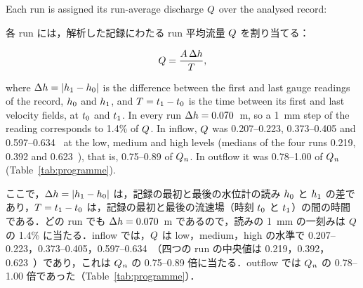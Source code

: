 \label{sec:discharge}

\begin{en}[M3-1]
Each run is assigned its run-average discharge $Q$ over the analysed record:
\end{en}
\begin{ja}
各 run には，解析した記録にわたる run 平均流量 $Q$ を割り当てる：
\end{ja}
\begin{equation}
Q = \frac{A \, \Delta h}{T},
\label{eq:Q}
\end{equation}
\begin{en}
where $\Delta h = |h_{1} - h_{0}|$ is the difference between the first and last gauge readings of the record, $h_{0}$ and $h_{1}$, and $T = t_{1} - t_{0}$ is the time between its first and last velocity fields, at $t_{0}$ and $t_{1}$. In every run $\Delta h = 0.070$~m, so a 1~mm step of the reading corresponds to 1.4\% of $Q$. In inflow, $Q$ was 0.207--0.223, 0.373--0.405 and 0.597--0.634~\Lps{} at the low, medium and high levels (medians of the four runs 0.219, 0.392 and 0.623~\Lps{}), that is, 0.75--0.89 of $Q_{\mathit{n}}$. In outflow it was 0.78--1.00 of $Q_{\mathit{n}}$ (Table~\ref{tab:programme}).
\end{en}
\begin{ja}
ここで，$\Delta h = |h_{1} - h_{0}|$ は，記録の最初と最後の水位計の読み $h_{0}$ と $h_{1}$ の差であり，$T = t_{1} - t_{0}$ は，記録の最初と最後の流速場（時刻 $t_{0}$ と $t_{1}$）の間の時間である．どの run でも $\Delta h = 0.070$~m であるので，読みの 1~mm の一刻みは $Q$ の 1.4\% に当たる．inflow では，$Q$ は low，medium，high の水準で 0.207--0.223，0.373--0.405，0.597--0.634~\Lps{}（四つの run の中央値は 0.219，0.392，0.623~\Lps{}）であり，これは $Q_{\mathit{n}}$ の 0.75--0.89 倍に当たる．outflow では $Q_{\mathit{n}}$ の 0.78--1.00 倍であった（Table~\ref{tab:programme}）．
\end{ja}

